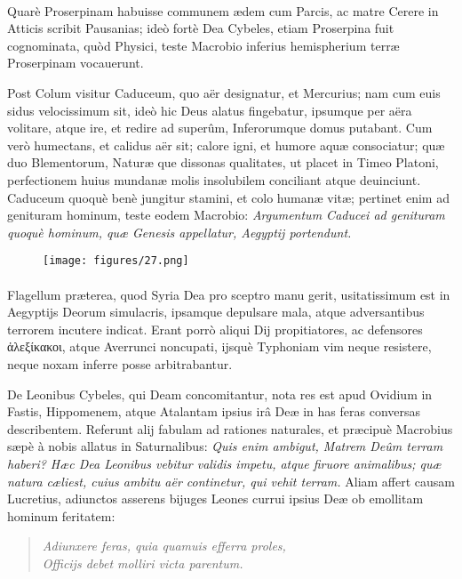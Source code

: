 \documentclass[a4paper, 11pt, oneside, polutonikogreek, latin]{article}
\begin{document}
\paragraph{}
Quarè Proserpinam habuisse communem ædem cum Parcis, ac matre Cerere in Atticis scribit Pausanias; ideò fortè Dea Cybeles, etiam Proserpina fuit cognominata, quòd Physici, teste Macrobio inferius hemispherium terræ Proserpinam vocauerunt.

Post Colum visitur Caduceum, quo aër designatur, et Mercurius; nam cum euis sidus velocissimum sit, ideò hic Deus alatus fingebatur, ipsumque per aëra volitare, atque ire, et redire ad superûm, Inferorumque domus putabant. Cum verò humectans, et calidus aër sit; calore igni, et humore aquæ consociatur; quæ duo Blementorum, Naturæ que dissonas qualitates, ut placet in Timeo Platoni, perfectionem huius mundanæ molis insolubilem conciliant atque deuinciunt. Caduceum quoquè benè jungitur stamini, et colo humanæ vitæ; pertinet enim ad genituram hominum, teste eodem Macrobio: \emph{Argumentum Caducei ad genituram quoquè hominum, quæ Genesis appellatur, Aegyptij portendunt.}
\clearpage
\vspace*{\fill}
\begin{figure}[H]
\centering
\texttt{[image: figures/27.png]}
\end{figure}
\vspace*{\fill}
\clearpage
\paragraph{}
Flagellum præterea, quod Syria Dea pro sceptro manu gerit, usitatissimum est in Aegyptijs Deorum simulacris, ipsamque depulsare mala, atque adversantibus terrorem incutere indicat. Erant porrò aliqui Dij propitiatores, ac defensores ἀλεξίκακοι, atque Averrunci noncupati, ijsquè Typhoniam vim neque resistere, neque noxam inferre posse arbitrabantur.

De Leonibus Cybeles, qui Deam concomitantur, nota res est apud Ovidium in Fastis, Hippomenem, atque Atalantam ipsius irâ Deæ in has feras conversas describentem. Referunt alij fabulam ad rationes naturales, et præcipuè Macrobius sæpè à nobis allatus in Saturnalibus: \emph{Quis enim ambigut, Matrem Deûm terram haberi? Hæc Dea Leonibus vebitur validis impetu, atque firuore animalibus; quæ natura cæliest, cuius ambitu aër continetur, qui vehit terram.} Aliam affert causam Lucretius, adiunctos asserens bijuges Leones currui ipsius Deæ ob emollitam hominum feritatem:
\begin{quote}
\emph{Adiunxere feras, quia quamuis efferra proles,}\\
\emph{Officijs debet molliri victa parentum.}\\
\end{quote}
\vspace*{-8mm}
\end{document}
